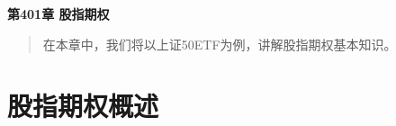 \newpage
\maketitle
\begin{center}
\Large \textbf{第401章 股指期权} \quad 
\end{center}
\begin{abstract}
在本章中，我们将以上证50ETF为例，讲解股指期权基本知识。
\end{abstract}
\section{股指期权概述}

